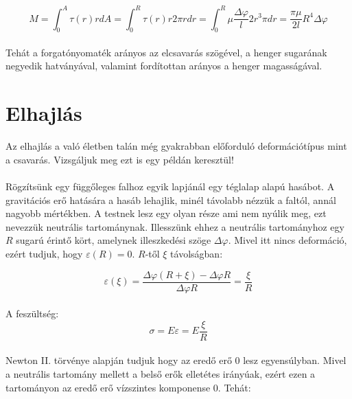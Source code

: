 \documentclass[a4paper]{article}
\begin{document}
\begin{equation}
M=\int^{A}_{0}\tau(r)rdA=\int^{R}_{0}\tau(r)r2\pi rdr=\int^{R}_{0}\mu\frac{\Delta\varphi}{l}2r^{3}\pi dr=\frac{\pi\mu}{2l}R^{4}\Delta\varphi
\end{equation}
\\
Tehát a forgatónyomaték arányos az elcsavarás szögével, a henger sugarának negyedik hatványával, valamint fordítottan arányos a henger magasságával.

\newpage
\section{Elhajlás}
Az elhajlás a való életben talán még gyakrabban előforduló deformációtípus mint a csavarás. Vizsgáljuk meg ezt is egy példán keresztül!
\\
\\
Rögzítsünk egy függőleges falhoz egyik lapjánál egy téglalap alapú hasábot. A gravitációs erő hatására a hasáb lehajlik, minél távolabb nézzük a faltól, annál nagyobb mértékben. A testnek lesz egy olyan része ami nem nyúlik meg, ezt nevezzük neutrális tartománynak. Illesszünk ehhez a neutrális tartományhoz egy
$R$ sugarú érintő kört, amelynek illeszkedési szöge $\Delta\varphi$. Mivel itt nincs deformáció, ezért tudjuk, hogy $\varepsilon (R)=0$. $R$-től $\xi$ távolságban:

\begin{equation}
\varepsilon (\xi)=\frac{\Delta\varphi (R+\xi)-\Delta\varphi R}{\Delta\varphi R}=\frac{\xi}{R}
\end{equation}
\\
A feszültség:
\begin{equation}
\sigma = E\varepsilon=E\frac{\xi}{R}
\end{equation}
\\
Newton II. törvénye alapján tudjuk hogy az eredő erő 0 lesz egyensúlyban. Mivel a neutrális tartomány mellett a belső erők elletétes irányúak, ezért ezen a tartományon az eredő erő vízszintes komponense 0. Tehát:
\end{document}
